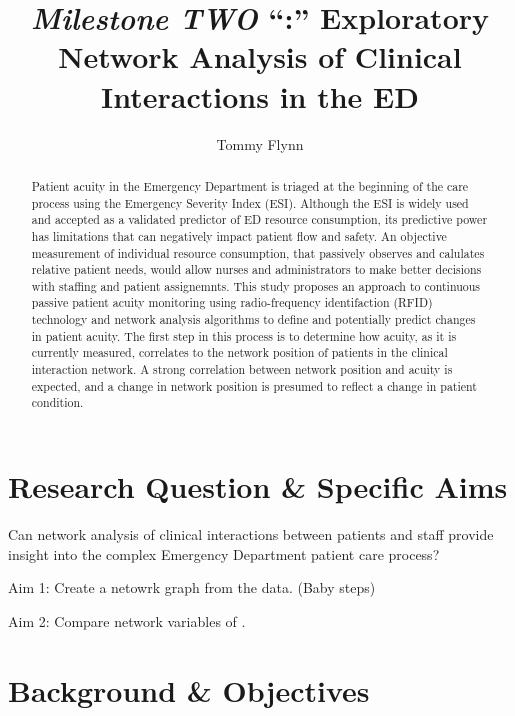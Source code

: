 \documentclass[]{elsarticle} %
\begin{document}
\begin{frontmatter}

  \title{\emph{Milestone TWO} ``:'' Exploratory Network Analysis of Clinical
Interactions in the ED}
    \author[Emory University]{Tommy Flynn}
      \address[Emory University]{Find the GitHub repository for this Milestone at
\url{https://github.com/tommyflynn/Flynn_N741_Project/tree/master/Flynn_Project}}
  
  \begin{abstract}
  Patient acuity in the Emergency Department is triaged at the beginning
  of the care process using the Emergency Severity Index (ESI). Although
  the ESI is widely used and accepted as a validated predictor of ED
  resource consumption, its predictive power has limitations that can
  negatively impact patient flow and safety. An objective measurement of
  individual resource consumption, that passively observes and calulates
  relative patient needs, would allow nurses and administrators to make
  better decisions with staffing and patient assignemnts. This study
  proposes an approach to continuous passive patient acuity monitoring
  using radio-frequency identifaction (RFID) technology and network
  analysis algorithms to define and potentially predict changes in patient
  acuity. The first step in this process is to determine how acuity, as it
  is currently measured, correlates to the network position of patients in
  the clinical interaction network. A strong correlation between network
  position and acuity is expected, and a change in network position is
  presumed to reflect a change in patient condition.
  \end{abstract}
  
 \end{frontmatter}

\section{Research Question \& Specific
Aims}\label{research-question-specific-aims}

Can network analysis of clinical interactions between patients and staff
provide insight into the complex Emergency Department patient care
process?

Aim 1: Create a netowrk graph from the data. (Baby steps)

Aim 2: Compare network variables of .

\section{Background \& Objectives}\label{background-objectives}
\end{document}
